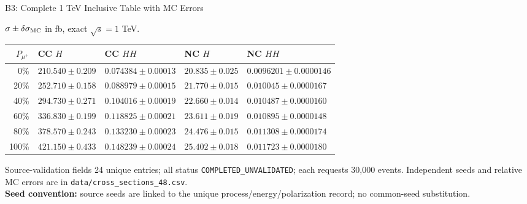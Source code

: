 \documentclass[aspectratio=1610,english]{beamer}
\newcommand{\src}[1]{\vfill{\par\color{black!65}\fontsize{6.4}{7.4}\selectfont\emph{Source:} #1\par}}
\begin{document}
\begin{frame}[t]{B3: Complete 1 TeV Inclusive Table with MC Errors}
\scriptsize

\begin{center}\scriptsize $\sigma\pm\delta\sigma_{\rm MC}$ in fb, exact $\sqrt{s}=1$ TeV.\end{center}
\begin{center}\setlength{\tabcolsep}{3pt}\renewcommand{\arraystretch}{1.23}\begin{tabular}{rllll}\toprule $P_{\mu^+}$ & CC $H$ & CC $HH$ & NC $H$ & NC $HH$ \\ \midrule
0\% & $210.540\pm0.209$ & $0.074384\pm0.00013$ & $20.835\pm0.025$ & $0.0096201\pm0.0000146$ \\
20\% & $252.710\pm0.158$ & $0.088979\pm0.00015$ & $21.770\pm0.015$ & $0.010045\pm0.0000167$ \\
40\% & $294.730\pm0.271$ & $0.104016\pm0.00019$ & $22.660\pm0.014$ & $0.010487\pm0.0000160$ \\
60\% & $336.830\pm0.199$ & $0.118825\pm0.00021$ & $23.611\pm0.019$ & $0.010895\pm0.0000148$ \\
80\% & $378.570\pm0.243$ & $0.133230\pm0.00023$ & $24.476\pm0.015$ & $0.011308\pm0.0000174$ \\
100\% & $421.150\pm0.433$ & $0.148239\pm0.00024$ & $25.402\pm0.018$ & $0.011723\pm0.0000180$ \\
\bottomrule\end{tabular}
\end{center}
\vspace{-.4em}
\begin{block}{Source-validation fields}
\justifying	\scriptsize
24 unique entries; all status \texttt{COMPLETED\_UNVALIDATED}; each requests 30,000 events. Independent seeds and relative MC errors are in \texttt{data/cross\_sections\_48.csv}.\\[.15em]
\textbf{Seed convention:} source seeds are linked to the unique process/energy/polarization record; no common-seed substitution.
\end{block}

\end{frame}
\end{document}

